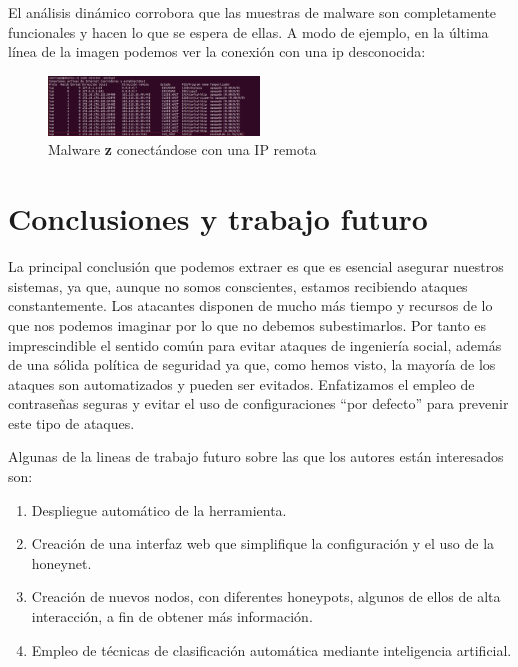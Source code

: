 \documentclass[journal]{IEEEtran}
\begin{document}
El análisis dinámico corrobora que las muestras de malware son completamente funcionales y hacen lo que se espera de ellas. A modo de ejemplo, en la última línea de la imagen podemos ver la conexión con una ip desconocida:

\begin{figure}[H]
\centering
\includegraphics[width=0.5\textwidth]{img/netstat}
\caption{Malware {\bf z} conectándose con una IP remota}
\label{fig:netstat}
\end{figure}


\section{Conclusiones y trabajo futuro}

La principal conclusión que podemos extraer es que es esencial asegurar nuestros sistemas, ya que, aunque no somos conscientes, estamos recibiendo ataques constantemente. Los atacantes disponen de mucho más tiempo y recursos de lo que nos podemos imaginar por lo que no debemos subestimarlos. Por tanto es imprescindible el sentido común para evitar ataques de ingeniería social, además de una sólida política de seguridad ya que, como hemos visto, la mayoría de los ataques son automatizados y pueden ser evitados. Enfatizamos el empleo de contraseñas seguras y evitar el uso de configuraciones “por defecto” para prevenir este tipo de ataques.

Algunas de la lineas de trabajo futuro sobre las que los autores están interesados son:

\begin{enumerate}
\item Despliegue automático de la herramienta.
\item Creación de una interfaz web que simplifique la configuración y el uso de la honeynet.
\item Creación de nuevos nodos, con diferentes honeypots, algunos de ellos de alta interacción, a fin de obtener más información.
\item Empleo de técnicas de clasificación automática mediante inteligencia artificial.
\end{enumerate}
\end{document}
